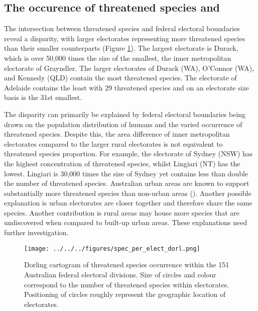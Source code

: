 \documentclass[a4paper,11pt]{article}
\begin{document}
\subsection{The occurence of threatened species and }
The intersection between threatened species and federal electoral boundaries reveal a disparity, with larger electorates representing more threatened species than their smaller counterparts (Figure \ref{fig:dorl}). The largest electorate is Durack, which is over 50,000 times the size of the smallest, the inner metropolitan electorate of Grayndler. The larger electorates of Durack (WA), O'Connor (WA), and Kennedy (QLD) contain the most threatened species. The electorate of Adelaide contains the least with 29 threatened species and on an electorate size basis is the 31st smallest. 

The disparity can primarily be explained by federal electoral boundaries being drawn on the population distribution of humans and the varied occurrence of threatened species. Despite this, the area difference of inner metropolitan electorates compared to the larger rural electorates is not equivalent to threatened species proportion. For example, the electorate of Sydney (NSW) has the highest concentration of threatened species, whilst Lingiari (NT) has the lowest. Lingiari is 30,000 times the size of Sydney yet contains less than double the number of threatened species. Australian urban areas are known to support substantially more threatened species than non-urban areas (\cite{ivesCitiesAreHotspots2016, soanesConservationOpportunitiesThreatened2020}). Another possible explanation is urban electorates are closer together and therefore share the same species. Another contribution is rural areas may house more species that are undiscovered when compared to built-up urban areas. These explanations need further investigation.

\begin{figure}[H]
	\centering
    \texttt{[image: ../../../figures/spec\_per\_elect\_dorl.png]}
    \caption{Dorling cartogram of threatened species occurrence within the 151 Australian federal electoral divisions. Size of circles and colour correspond to the number of threatened species within electorates. Positioning of circles roughly represent the geographic location of electorates.}
    \label{fig:dorl}
\end{figure}
\end{document}
